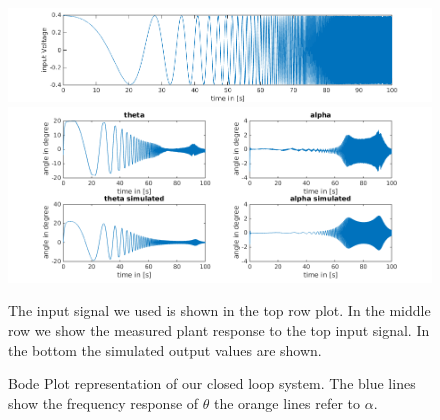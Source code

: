 \documentclass[ twoside,openright,titlepage,numbers=noenddot,headinclude,%
                footinclude=true,cleardoublepage=empty,abstractoff, %
                BCOR=5mm,paper=a4,fontsize=11pt,%
                ngerman,american,%
                ]{scrreprt}
\begin{document}
\begin{figure}
\includegraphics[scale = 0.5]{images/input.png}
\includegraphics[scale = 0.505]{images/measSim2.png}
\caption{The input signal we used is shown in the top row plot. In the middle row we show the measured plant response to the top input signal. In the bottom the simulated output values are shown. }
\label{fig:timeDomain}
\end{figure}
\begin{figure}

%
\caption{Bode Plot representation of our closed loop system. The blue lines show the frequency response of $\theta$ the orange lines refer to $\alpha$.}
\label{fig:frequencyDomain}
\end{figure}
\end{document}
